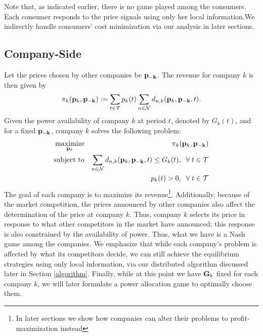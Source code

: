 Note that, as indicated earlier, there is no game played among the consumers. Each consumer responds to the price signals using only her local information.We indirectly handle consumers' cost minimization via our analysis in later sections.
\subsection{Company-Side}
Let the prices chosen by other companies be ${\bf{p_{-k}}}$. The revenue for company $k$ is then given by
\begin{equation}{\pi_k}({\bf{p}}_{k},{\bf{p_{-k}}}):=\sum_{t\in {\cal T}}p_k(t)\sum_{n\in {\cal N}}d_{n,k}({\bf{p}}_k,{\bf{p_{-k}}},t).\label{UC}\end{equation}
Given the power availability of company $k$ at period $t$, denoted by $G_k(t)$, and for a fixed ${\bf{p_{-k}}}$, company $k$ solves the following problem:
\begin{eqnarray}
\underset{\mathbf{p}_k}{\hbox{maximize}} && \pi_k ({\bf{p}}_k,{\bf{p}_{-k}})
\nonumber \\
\hbox{subject to} && \sum_{n\in {\cal N}} d_{n,k}({\bf{p}}_k,{\bf{p}_{-k}},t) \leq G_k(t),\;\; \forall \; t \in {\cal T} \label{prob2} \\
&& p_k(t)> 0, \;\; \forall \; t \in {\cal T} \label{end}
\end{eqnarray}
  The goal of each company is to maximize its revenue\footnote{In later sections we show how companies can alter their problems to profit-maximization instead}. Additionally, because of the market competition, the prices announced by other companies also affect the determination of the price at company $k$. Thus, company $k$ selects its price in response to what other competitors in the market have announced; this response is also constrained by the availability of power. Thus, what we have is a Nash game among the companies. We emphasize that while each company's problem is affected by what its competitors decide, we can still achieve the equilibrium strategies using only local information, via our distributed algorithm discussed later in Section \ref{algorithm}. Finally, while at this point we have ${\bf G}_k$ fixed for each company $k$, we will later formulate a power allocation game to optimally choose them. 


